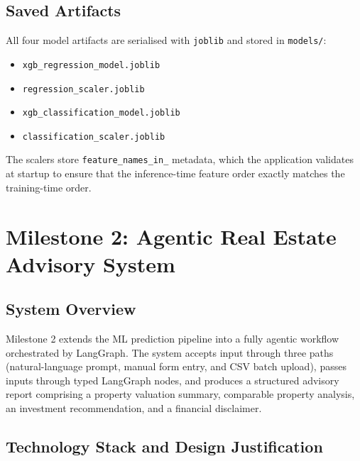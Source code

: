 \documentclass[12pt,a4paper]{article}
\begin{document}
\subsection{Saved Artifacts}

All four model artifacts are serialised with \texttt{joblib} and stored in \texttt{models/}:

\begin{itemize}[leftmargin=1.5em, noitemsep]
  \item \texttt{xgb\_regression\_model.joblib}
  \item \texttt{regression\_scaler.joblib}
  \item \texttt{xgb\_classification\_model.joblib}
  \item \texttt{classification\_scaler.joblib}
\end{itemize}

The scalers store \texttt{feature\_names\_in\_} metadata, which the application validates at startup to ensure that the inference-time feature order exactly matches the training-time order.

\section{Milestone 2: Agentic Real Estate Advisory System}

\subsection{System Overview}

Milestone 2 extends the ML prediction pipeline into a fully agentic workflow orchestrated by LangGraph. The system accepts input through three paths (natural-language prompt, manual form entry, and CSV batch upload), passes inputs through typed LangGraph nodes, and produces a structured advisory report comprising a property valuation summary, comparable property analysis, an investment recommendation, and a financial disclaimer.

\subsection{Technology Stack and Design Justification}
\end{document}
